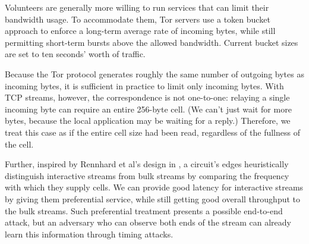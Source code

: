 \documentclass[times,10pt,twocolumn]{article}
\begin{document}
\label{subsec:rate-limit}

Volunteers are generally more willing to run services that can limit
their bandwidth usage. To accommodate them, Tor servers use a
token bucket approach \cite{tannenbaum96} to 
enforce a long-term average rate of incoming bytes, while still
permitting short-term bursts above the allowed bandwidth. Current bucket
sizes are set to ten seconds' worth of traffic.


Because the Tor protocol generates roughly the same number of outgoing
bytes as incoming bytes, it is sufficient in practice to limit only
incoming bytes.
With TCP streams, however, the correspondence is not one-to-one:
relaying a single incoming byte can require an entire 256-byte cell.
(We can't just wait for more bytes, because the local application may
be waiting for a reply.)
Therefore, we treat this case as if the entire
cell size had been read, regardless of the fullness of the cell.

Further, inspired by Rennhard et al's design in \cite{anonnet}, a
circuit's edges heuristically distinguish interactive streams from bulk
streams by comparing the frequency with which they supply cells.  We can
provide good latency for interactive streams by giving them preferential
service, while still getting good overall throughput to the bulk
streams. Such preferential treatment presents a possible end-to-end
attack, but an adversary who can observe both
ends of the stream can already learn this information through timing
attacks.
\end{document}
